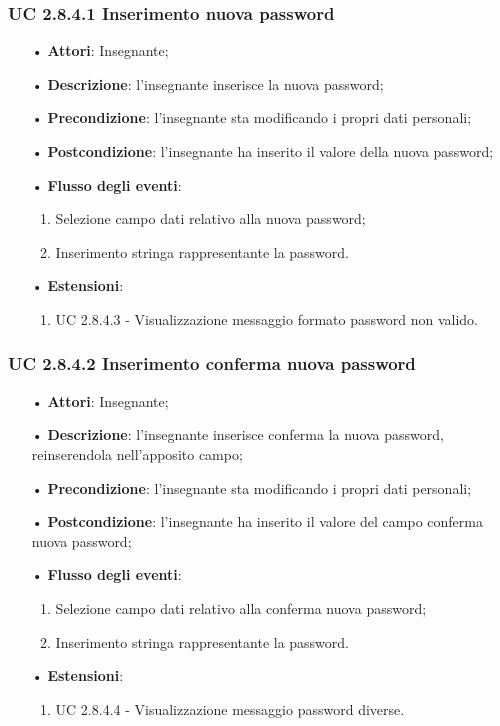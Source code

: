\subsubsection{UC 2.8.4.1 Inserimento nuova password}
\begin{itemize}
	\item[•]\textbf{Attori}: Insegnante;
	\item[•]\textbf{Descrizione}: l'insegnante inserisce la nuova password;
	\item[•]\textbf{Precondizione}: l'insegnante sta modificando i propri dati personali;
	\item[•]\textbf{Postcondizione}: l'insegnante ha inserito il valore della nuova password; 
	\item[•]\textbf{Flusso degli eventi}: 
	\begin{enumerate}
		\item Selezione campo dati relativo alla nuova password;
		\item Inserimento stringa rappresentante la password.
	\end{enumerate}
	\item[•]\textbf{Estensioni}:
	\begin{enumerate}
		\item UC 2.8.4.3 - Visualizzazione messaggio formato password non valido.
	\end{enumerate}
\end{itemize}

\subsubsection{UC 2.8.4.2 Inserimento conferma nuova password}
\begin{itemize}
	\item[•]\textbf{Attori}: Insegnante;
	\item[•]\textbf{Descrizione}: l'insegnante inserisce conferma la nuova password, reinserendola nell'apposito campo;
	\item[•]\textbf{Precondizione}: l'insegnante sta modificando i propri dati personali;
	\item[•]\textbf{Postcondizione}: l'insegnante ha inserito il valore del campo conferma nuova password; 
	\item[•]\textbf{Flusso degli eventi}: 
	\begin{enumerate}
		\item Selezione campo dati relativo alla conferma nuova password;
		\item Inserimento stringa rappresentante la password.
	\end{enumerate}
	\item[•]\textbf{Estensioni}:
	\begin{enumerate}
		\item UC 2.8.4.4 - Visualizzazione messaggio password diverse.
	\end{enumerate}
\end{itemize}


